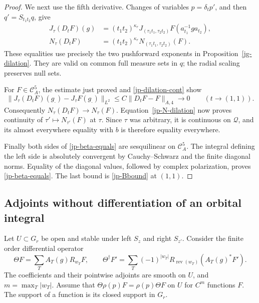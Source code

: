 \begin{proof}
We next use the fifth derivative.
Changes of variables \(p=\delta_t p'\), and then
\(q'=S_{t_1t_2}q\), give
\begin{align}
 J_\tau(D_tF)(g)
     &=(t_1t_2)^{\kappa_r}
           J_{(\tau_1t_1,\tau_2t_2)}F(a_{t_1}^{-1}g a_{t_2}),
                                                   \label{jp-J-dilation}\\
 N_\tau(D_tF)
     &=(t_1t_2)^{\kappa_r}
                           N_{(\tau_1t_1,\tau_2t_2)}(F).
                                                   \label{jp-N-dilation}
\end{align}
These equalities use precisely the two pushforward exponents
in Proposition~\ref{jg-dilation}.
They are valid on common full measure sets in \(q\);
the radial scaling preserves null sets.

For \(F\in\mathcal C_A^5\), the estimate just proved and
\eqref{jp-dilation-cont} show
\[
 \|J_\tau(D_tF)(g_\cdot)-J_\tau F(g_\cdot)\|_{L^2}
 \leq C\|D_tF-F\|_{A,4}
                 \longrightarrow0\qquad(t\longrightarrow(1,1)).
\]
Consequently \(N_\tau(D_tF)\to N_\tau(F)\).
Equation~\eqref{jp-N-dilation} now proves continuity of
\(\tau'\mapsto N_{\tau'}(F)\) at \(\tau\).
Since \(\tau\) was arbitrary, it is continuous on
\(\mathcal Q\), and its almost everywhere equality with
\(b\) is therefore equality everywhere.

Finally both sides of \eqref{jp-beta-equals} are
sesquilinear on \(\mathcal C_A^5\).
The integral defining the left side is absolutely convergent
by Cauchy--Schwarz and the finite diagonal norms.
Equality of the diagonal values, followed by complex
polarization, proves \eqref{jp-beta-equals}.
The last bound is \eqref{jp-Bbound} at \((1,1)\).
\end{proof}

\subsection{Adjoints without differentiation of an orbital integral}

Let \(U\subset G_r\) be open and stable under left \(S_z\)
and right \(S_{z'}\).
Consider the finite order differential operator
\[
              \Theta F=\sum_T A_T(g)R_{w_T}F,
 \qquad
 \Theta^\dagger F'
       =\sum_T(-1)^{|w_T|}
                     R_{\operatorname{rev}(w_T)}(A_T(g)^*F').
\]
The coefficients and their pointwise adjoints are smooth
on \(U\), and \(m=\max_T|w_T|\).
Assume that \(\Theta\rho(p)F=\rho(p)\Theta F\) on \(U\)
for \(C^m\) functions \(F\).
The support of a function is its closed support in \(G_r\).

